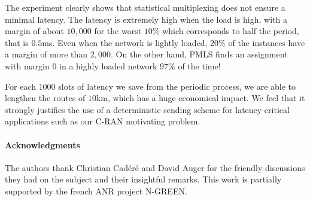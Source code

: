 \documentclass[10pt, conference, letterpaper]{IEEEtran}
\newcommand\pazl{\textsc{pazl}\xspace}
\newcommand\pall{\textsc{pall}\xspace}
\begin{document}
     The experiment clearly shows that statistical multiplexing does not ensure a minimal latency. 
     The latency is extremely high when the load is high, with a margin of about $10,000$ for the worst $10\%$ which corresponds to half the period, that is $0.5$ms. Even when the network is lightly loaded, $20\%$ of the instances have a margin of more than $2,000$. On the other hand, PMLS finds an assignment with margin $0$ in a highly loaded network $97\%$ of the time! 

     For each $1000$ slots of latency we save from the periodic process, we are able to lengthen the routes of $10$km, which has a huge economical impact. We feel that it strongly justifies the use of a deterministic sending scheme for latency critical applications such as our C-RAN motivating problem.     
% 
% 
%    
% 
% 

 \paragraph*{Acknowledgments} The authors thank Christian Cad\'er\'e and David Auger for the friendly discussions
 they had on the subject and their insightful remarks. This work is partially supported by the french ANR project N-GREEN.



\end{document}
